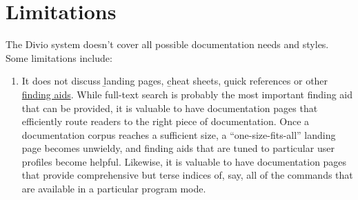 \section*{Limitations}

The Divio system doesn't cover all possible documentation needs and styles. Some
limitations include:

\begin{enumerate}
  \item It does not discuss \b{landing pages}, \b{cheat sheets}, \b{quick
  references} or other \href{https://en.wikipedia.org/wiki/Finding_aid}{finding
  aids}. While full-text search is probably the most important finding aid that
  can be provided, it is valuable to have documentation pages that efficiently
  route readers to the right piece of documentation. Once a documentation corpus
  reaches a sufficient size, a “one-size-fits-all” landing page becomes
  unwieldy, and finding aids that are tuned to particular user profiles become
  helpful. Likewise, it is valuable to have documentation pages that provide
  comprehensive but terse indices of, say, all of the commands that are
  available in a particular program mode.
\end{enumerate}